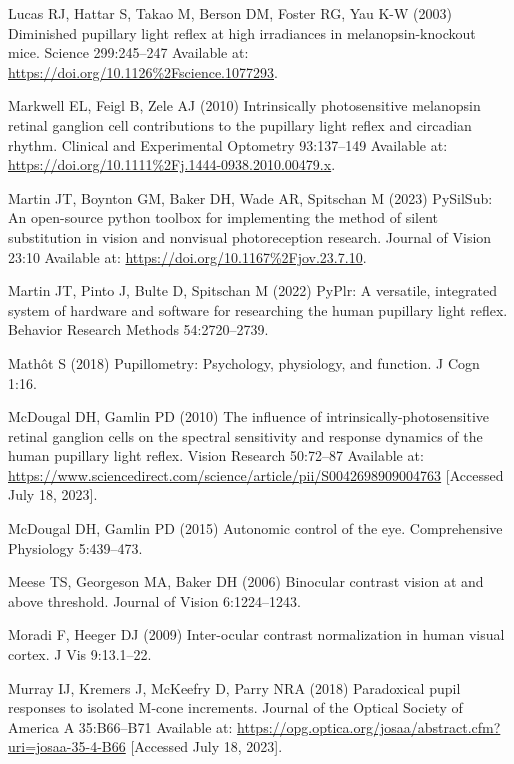 \documentclass[
]{article}
\begin{document}
\leavevmode\hypertarget{ref-Lucas2003}{}%
Lucas RJ, Hattar S, Takao M, Berson DM, Foster RG, Yau K-W (2003) Diminished pupillary light reflex at high irradiances in melanopsin-knockout mice. Science 299:245--247 Available at: \url{https://doi.org/10.1126\%2Fscience.1077293}.

\leavevmode\hypertarget{ref-Markwell2010}{}%
Markwell EL, Feigl B, Zele AJ (2010) Intrinsically photosensitive melanopsin retinal ganglion cell contributions to the pupillary light reflex and circadian rhythm. Clinical and Experimental Optometry 93:137--149 Available at: \url{https://doi.org/10.1111\%2Fj.1444-0938.2010.00479.x}.

\leavevmode\hypertarget{ref-Martin2023}{}%
Martin JT, Boynton GM, Baker DH, Wade AR, Spitschan M (2023) PySilSub: An open-source python toolbox for implementing the method of silent substitution in vision and nonvisual photoreception research. Journal of Vision 23:10 Available at: \url{https://doi.org/10.1167\%2Fjov.23.7.10}.

\leavevmode\hypertarget{ref-Martin2022}{}%
Martin JT, Pinto J, Bulte D, Spitschan M (2022) PyPlr: A versatile, integrated system of hardware and software for researching the human pupillary light reflex. Behavior Research Methods 54:2720--2739.

\leavevmode\hypertarget{ref-Mathot2018}{}%
Mathôt S (2018) Pupillometry: Psychology, physiology, and function. J Cogn 1:16.

\leavevmode\hypertarget{ref-McDougal2010}{}%
McDougal DH, Gamlin PD (2010) The influence of intrinsically-photosensitive retinal ganglion cells on the spectral sensitivity and response dynamics of the human pupillary light reflex. Vision Research 50:72--87 Available at: \url{https://www.sciencedirect.com/science/article/pii/S0042698909004763} {[}Accessed July 18, 2023{]}.

\leavevmode\hypertarget{ref-McDougal2015}{}%
McDougal DH, Gamlin PD (2015) Autonomic control of the eye. Comprehensive Physiology 5:439--473.

\leavevmode\hypertarget{ref-Meese2006}{}%
Meese TS, Georgeson MA, Baker DH (2006) Binocular contrast vision at and above threshold. Journal of Vision 6:1224--1243.

\leavevmode\hypertarget{ref-Moradi2009}{}%
Moradi F, Heeger DJ (2009) Inter-ocular contrast normalization in human visual cortex. J Vis 9:13.1--22.

\leavevmode\hypertarget{ref-Murray2018}{}%
Murray IJ, Kremers J, McKeefry D, Parry NRA (2018) Paradoxical pupil responses to isolated M-cone increments. Journal of the Optical Society of America A 35:B66--B71 Available at: \url{https://opg.optica.org/josaa/abstract.cfm?uri=josaa-35-4-B66} {[}Accessed July 18, 2023{]}.
\end{document}
